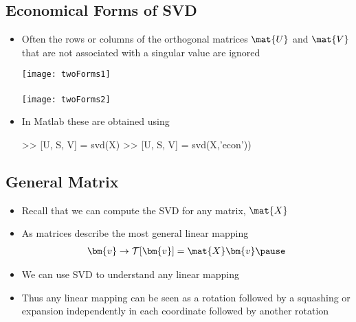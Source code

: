 
\begin{slide}
\section[-2.5]{Economical Forms of SVD}

\begin{PauseHighLight}
  \begin{itemize}
  \item Often the rows or columns of the orthogonal matrices $\mat{U}$
    and $\mat{V}$ that are not associated with a singular value are
    ignored\pause
    \begin{center}
      \texttt{[image: twoForms1]}\\
      \ \\
      \texttt{[image: twoForms2]}
    \end{center}
  \item In Matlab these are obtained using
\begin{matlab}
  >> [U, S, V] = svd(X)
  >> [U, S, V] = svd(X,'econ'))
\end{matlab}\pause
  \end{itemize}
\end{PauseHighLight}

\end{slide}

\Outline %

\begin{slide}
\section{General Matrix}

\begin{PauseHighLight}
  \begin{itemize}
  \item Recall that we can compute the SVD for any matrix,
    $\mat{X}$\pause
  \item As matrices describe the most general linear mapping
    \begin{align*}
      \bm{v} \rightarrow \mathcal{T}[\bm{v}] = \mat{X}\bm{v}\pause
    \end{align*}
  \item We can use SVD to understand any linear mapping\pause
  \item Thus any linear mapping can be seen as a rotation followed by a
    squashing or expansion independently in each coordinate followed by
    another rotation\pause 
  \end{itemize}
\end{PauseHighLight}

\end{slide}

